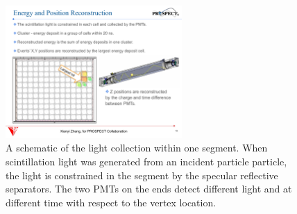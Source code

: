 \begin{figure}[h]
    \centering
    \includegraphics[width=0.6\textwidth]{Figures/Z_reconstruction.pdf}
    \caption[A schematic of a single segment light collection ]{
	A schematic of the light collection within one segment. 
	When scintillation light was generated from an incident particle particle, the light is constrained in the segment by the specular reflective separators.
	The two PMTs on the ends detect different light and at different time with respect to the vertex location.
	}
    \label{fig:Zreconstruction}
\end{figure}
	
